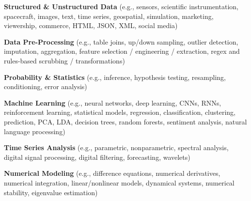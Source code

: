 \begin{itemize*}
  \item \textbf{Structured \& Unstructured Data} (e.g., sensors,
    scientific instrumentation, spacecraft, 
    images, text, time series, geospatial, simulation, 
    marketing, viewership, commerce, HTML, JSON, XML, social media)
  \item \textbf{Data Pre-Processing} (e.g., table joins, up/down sampling, outlier detection, 
    imputation, aggregation, feature selection / engineering /
    extraction, regex and rules-based scrubbing / transformations)
  \item \textbf{Probability \& Statistics} (e.g., inference,
    hypothesis testing, resampling, conditioning, error analysis)
  \item \textbf{Machine Learning} (e.g., neural networks,
    deep learning, CNNs, RNNs, reinforcement learning, statistical
    models, regression, classification, clustering, prediction,
    PCA, LDA, decision trees, random forests, sentiment analysis,
    natural language processing)
  \item \textbf{Time Series Analysis} (e.g., parametric, nonparametric, spectral
    analysis, digital signal processing, digital filtering, forecasting,
    wavelets)
  \item \textbf{Numerical Modeling}
    (e.g., difference equations, numerical derivatives, numerical
    integration, linear/nonlinear models, dynamical systems, numerical stability, 
    eigenvalue estimation)
\end{itemize*}
\vspace{-0.2cm}

